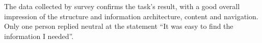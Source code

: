 The data collected by survey confirms the task's result, with a good overall impression of the structure and information architecture, content and navigation. Only one person replied neutral at the statement ``It was easy to find the information I needed''.
%
%
